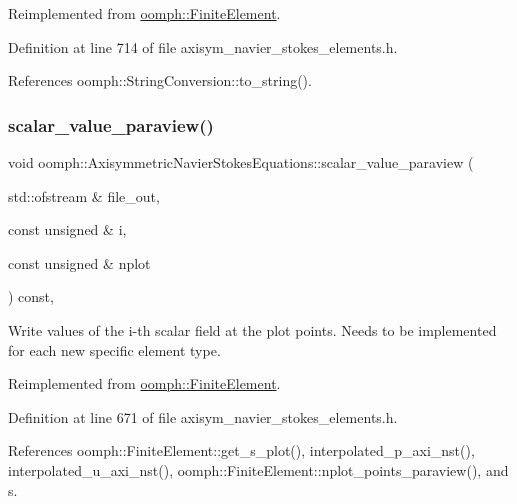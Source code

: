 Reimplemented from \hyperlink{classoomph_1_1FiniteElement_a49cc2d4f7ed5772bbc96f06760372b51}{oomph\+::\+Finite\+Element}.



Definition at line 714 of file axisym\+\_\+navier\+\_\+stokes\+\_\+elements.\+h.



References oomph\+::\+String\+Conversion\+::to\+\_\+string().

\mbox{\label{classoomph_1_1AxisymmetricNavierStokesEquations_a2971656a8fa501ac3e4710c3f1c44275}} 
\subsubsection{\texorpdfstring{scalar\+\_\+value\+\_\+paraview()}{scalar\_value\_paraview()}}
{\footnotesize\ttfamily void oomph\+::\+Axisymmetric\+Navier\+Stokes\+Equations\+::scalar\+\_\+value\+\_\+paraview (\begin{DoxyParamCaption}\item[{std\+::ofstream \&}]{file\+\_\+out,  }\item[{const unsigned \&}]{i,  }\item[{const unsigned \&}]{nplot }\end{DoxyParamCaption}) const\hspace{0.3cm}{\ttfamily [inline]}, {\ttfamily [virtual]}}



Write values of the i-\/th scalar field at the plot points. Needs to be implemented for each new specific element type. 



Reimplemented from \hyperlink{classoomph_1_1FiniteElement_a02cf8832a5e2886f1572bd36f7a7c1e3}{oomph\+::\+Finite\+Element}.



Definition at line 671 of file axisym\+\_\+navier\+\_\+stokes\+\_\+elements.\+h.



References oomph\+::\+Finite\+Element\+::get\+\_\+s\+\_\+plot(), interpolated\+\_\+p\+\_\+axi\+\_\+nst(), interpolated\+\_\+u\+\_\+axi\+\_\+nst(), oomph\+::\+Finite\+Element\+::nplot\+\_\+points\+\_\+paraview(), and s.

